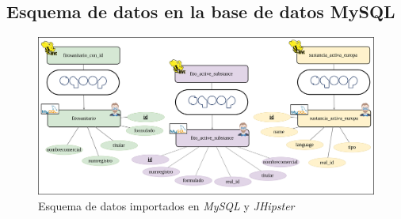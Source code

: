 \begin{landscape}
\section{Esquema de datos en la base de datos MySQL} \label{a.datos.modelo}
\begin{figure}[h!]
    
    \includegraphics[width=1.5\textwidth]{Imagenes/datosmysql}
    \caption{Esquema de datos importados en \textit{MySQL} y \textit{JHipster}}
    \label{fig:datosmysql}
\end{figure}

\end{landscape}

